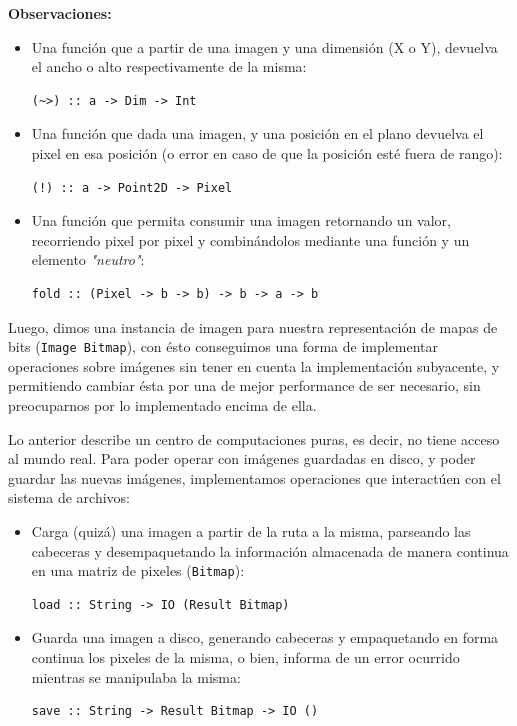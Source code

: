 \documentclass[a4paper, 11pt]{article} %
\begin{document}
	\textbf{Observaciones:}
	\begin{itemize}
		\item Una función que a partir de una imagen y una dimensión (X o Y), devuelva el ancho o alto respectivamente de la misma:
		\begin{lstlisting}
(~>) :: a -> Dim -> Int
		\end{lstlisting}

		\item Una función que dada una imagen, y una posición en el plano devuelva el pixel en esa posición (o error en caso de que la posición esté fuera de rango):
		\begin{lstlisting}
(!) :: a -> Point2D -> Pixel
		\end{lstlisting}
			  
		\item Una función que permita consumir una imagen retornando un valor, recorriendo pixel por pixel y combinándolos mediante una función y un elemento \textit{"neutro"}:
		\begin{lstlisting}
fold :: (Pixel -> b -> b) -> b -> a -> b
		\end{lstlisting}
	\end{itemize}
	
\noindent Luego, dimos una instancia de imagen para nuestra representación de mapas de bits (\texttt{Image Bitmap}), con ésto conseguimos una forma de implementar operaciones sobre imágenes sin tener en cuenta la implementación subyacente, y permitiendo cambiar ésta por una de mejor performance de ser necesario, sin preocuparnos por lo implementado encima de ella.

\pagebreak

\noindent Lo anterior describe un centro de computaciones puras, es decir, no tiene acceso al mundo real. Para poder operar con imágenes guardadas en disco, y poder guardar las nuevas imágenes, implementamos operaciones que interactúen con el sistema de archivos:
	\begin{itemize}
		\item Carga (quizá) una imagen a partir de la ruta a la misma, parseando las cabeceras y desempaquetando la información almacenada de manera continua en una matriz de pixeles (\texttt{Bitmap}):  
		\begin{lstlisting}
load :: String -> IO (Result Bitmap)
		\end{lstlisting}

		\item Guarda una imagen a disco, generando cabeceras y empaquetando en forma continua los pixeles de la misma, o bien, informa de un error ocurrido mientras se manipulaba la misma:
		\begin{lstlisting}
save :: String -> Result Bitmap -> IO ()
		\end{lstlisting}
	\end{itemize}
\end{document}
